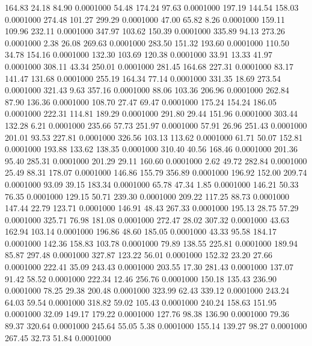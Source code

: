  164.83   24.18   84.90   0.0001000
  54.48  174.24   97.63   0.0001000
 197.19  144.54  158.03   0.0001000
 274.48  101.27  299.29   0.0001000
  47.00   65.82    8.26   0.0001000
 159.11  109.96  232.11   0.0001000
 347.97  103.62  150.39   0.0001000
 335.89   94.13  273.26   0.0001000
   2.38   26.08  269.63   0.0001000
 283.50  151.32  193.60   0.0001000
 110.50   34.78  154.16   0.0001000
 132.30  103.69  120.38   0.0001000
  33.91   13.33   41.97   0.0001000
 308.11   43.34  250.01   0.0001000
 281.45  164.68  227.31   0.0001000
  83.17  141.47  131.68   0.0001000
 255.19  164.34   77.14   0.0001000
 331.35   18.69  273.54   0.0001000
 321.43    9.63  357.16   0.0001000
  88.06  103.36  206.96   0.0001000
 262.84   87.90  136.36   0.0001000
 108.70   27.47   69.47   0.0001000
 175.24  154.24  186.05   0.0001000
 222.31  114.81  189.29   0.0001000
 291.80   29.44  151.96   0.0001000
 303.44  132.28    6.21   0.0001000
 235.66   57.73  251.97   0.0001000
  57.91   26.96  251.43   0.0001000
 201.01   93.53  227.81   0.0001000
 326.56  103.13  113.62   0.0001000
  61.71   50.07  152.81   0.0001000
 193.88  133.62  138.35   0.0001000
 310.40   40.56  168.46   0.0001000
 201.36   95.40  285.31   0.0001000
 201.29   29.11  160.60   0.0001000
   2.62   49.72  282.84   0.0001000
  25.49   88.31  178.07   0.0001000
 146.86  155.79  356.89   0.0001000
 196.92  152.00  209.74   0.0001000
  93.09   39.15  183.34   0.0001000
  65.78   47.34    1.85   0.0001000
 146.21   50.33   76.35   0.0001000
 129.15   50.71  239.30   0.0001000
 209.22  117.25   88.73   0.0001000
 147.44   22.79  123.71   0.0001000
 146.91   48.43  267.33   0.0001000
 195.13   28.75   57.29   0.0001000
 325.71   76.98  181.08   0.0001000
 272.47   28.02  307.32   0.0001000
  43.63  162.94  103.14   0.0001000
 196.86   48.60  185.05   0.0001000
  43.33   95.58  184.17   0.0001000
 142.36  158.83  103.78   0.0001000
  79.89  138.55  225.81   0.0001000
 189.94   85.87  297.48   0.0001000
 327.87  123.22   56.01   0.0001000
 152.32   23.20   27.66   0.0001000
 222.41   35.09  243.43   0.0001000
 203.55   17.30  281.43   0.0001000
 137.07   91.42   58.52   0.0001000
 222.34   12.46  256.76   0.0001000
 150.18  135.43  236.90   0.0001000
  78.25   29.38  200.48   0.0001000
 323.99   62.43  339.12   0.0001000
 243.24   64.03   59.54   0.0001000
 318.82   59.02  105.43   0.0001000
 240.24  158.63  151.95   0.0001000
  32.09  149.17  179.22   0.0001000
 127.76   98.38  136.90   0.0001000
  79.36   89.37  320.64   0.0001000
 245.64   55.05    5.38   0.0001000
 155.14  139.27   98.27   0.0001000
 267.45   32.73   51.84   0.0001000
